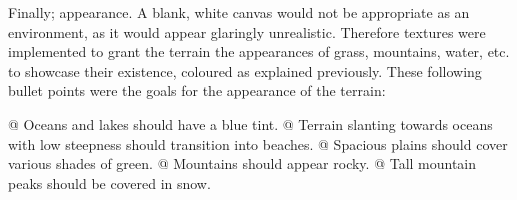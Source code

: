 Finally; appearance.
A blank, white canvas would not be appropriate as an environment, as it would appear glaringly unrealistic.
Therefore textures were implemented to grant the terrain the appearances of grass, mountains, water, etc. to showcase their existence, coloured as explained previously.
These following bullet points were the goals for the appearance of the terrain:

\begin{easylist}
 @ Oceans and lakes should have a blue tint.
 @ Terrain slanting towards oceans with low steepness should transition into beaches.
 @ Spacious plains should cover various shades of green.
 @ Mountains should appear rocky.
 @ Tall mountain peaks should be covered in snow.
\end{easylist}

